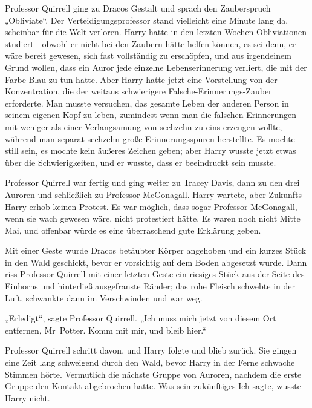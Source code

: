 {Professor Quirrell ging zu Dracos Gestalt und sprach den Zauberspruch „Obliviate“. Der Verteidigungsprofessor stand vielleicht eine Minute lang da, scheinbar für die Welt verloren. Harry hatte in den letzten Wochen Obliviationen studiert - obwohl er nicht bei den Zaubern hätte helfen können, es sei denn, er wäre bereit gewesen, sich fast vollständig zu erschöpfen, und aus irgendeinem Grund wollen, dass ein Auror jede einzelne Lebenserinnerung verliert, die mit der Farbe Blau zu tun hatte. Aber Harry hatte jetzt eine Vorstellung von der Konzentration, die der weitaus schwierigere Falsche-Erinnerungs-Zauber erforderte. Man musste versuchen, das gesamte Leben der anderen Person in seinem eigenen Kopf zu leben, zumindest wenn man die falschen Erinnerungen mit weniger als einer Verlangsamung von sechzehn zu eins erzeugen wollte, während man separat sechzehn große Erinnerungsspuren herstellte. Es mochte still sein, es mochte kein äußeres Zeichen geben; aber Harry wusste jetzt etwas über die Schwierigkeiten, und er wusste, dass er beeindruckt sein musste.

Professor Quirrell war fertig und ging weiter zu Tracey Davis, dann zu den drei Auroren und schließlich zu Professor McGonagall. Harry wartete, aber Zukunfts-Harry erhob keinen Protest. Es war möglich, dass sogar Professor McGonagall, wenn sie wach gewesen wäre, nicht protestiert hätte. Es waren noch nicht Mitte Mai, und offenbar würde es eine überraschend gute Erklärung geben.

Mit einer Geste wurde Dracos betäubter Körper angehoben und ein kurzes Stück in den Wald geschickt, bevor er vorsichtig auf dem Boden abgesetzt wurde. Dann riss Professor Quirrell mit einer letzten Geste ein riesiges Stück aus der Seite des Einhorns und hinterließ ausgefranste Ränder; das rohe Fleisch schwebte in der Luft, schwankte dann im Verschwinden und war weg.

„Erledigt“, sagte Professor Quirrell. „Ich muss mich jetzt von diesem Ort entfernen, Mr~Potter. Komm mit mir, und bleib hier.“

Professor Quirrell schritt davon, und Harry folgte und blieb zurück. Sie gingen eine Zeit lang schweigend durch den Wald, bevor Harry in der Ferne schwache Stimmen hörte. Vermutlich die nächste Gruppe von Auroren, nachdem die erste Gruppe den Kontakt abgebrochen hatte. Was sein zukünftiges Ich sagte, wusste Harry nicht.

}

